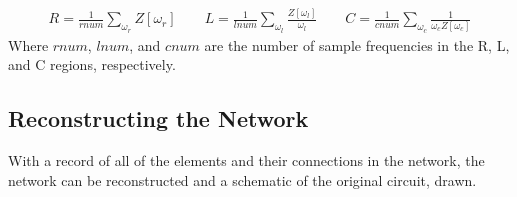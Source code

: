 \documentclass[11pt,twoside]{mitthesis}
\begin{document}
\begin{align*}
R=\frac{1}{rnum}\sum_{\omega_r}{Z[\omega_r]} \qquad
L=\frac{1}{lnum}\sum_{\omega_l}{\frac{Z[\omega_l]}{\omega_l} \qquad}
C=\frac{1}{cnum}\sum_{\omega_c}{\frac{1}{\omega_c Z[\omega_c]}}
\end{align*}
Where $rnum$, $lnum$, and $cnum$ are the number of sample frequencies in the R, L, and C regions, respectively.

\subsection{Reconstructing the Network}
With a record of all of the elements and their connections in the network, the network can be reconstructed and a schematic of the original circuit, drawn.

\ifdefined\DEBUG
\end{document}
